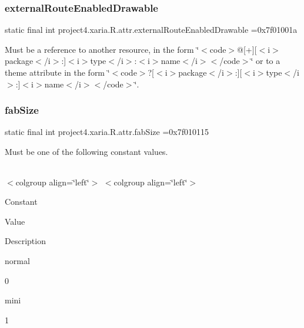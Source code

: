 \subsubsection{\texorpdfstring{external\+Route\+Enabled\+Drawable}{externalRouteEnabledDrawable}}
{\footnotesize\ttfamily static final int project4.\+xaria.\+R.\+attr.\+external\+Route\+Enabled\+Drawable =0x7f01001a\hspace{0.3cm}{\ttfamily [static]}}

Must be a reference to another resource, in the form \char`\"{}$<$code$>$@\mbox{[}+\mbox{]}\mbox{[}$<$i$>$package$<$/i$>$\+:\mbox{]}$<$i$>$type$<$/i$>$\+:$<$i$>$name$<$/i$>$$<$/code$>$\char`\"{} or to a theme attribute in the form \char`\"{}$<$code$>$?\mbox{[}$<$i$>$package$<$/i$>$\+:\mbox{]}\mbox{[}$<$i$>$type$<$/i$>$\+:\mbox{]}$<$i$>$name$<$/i$>$$<$/code$>$\char`\"{}. \mbox{\label{classproject4_1_1xaria_1_1R_1_1attr_a789956555161c24016c7cab1662f40f4}} 
\subsubsection{\texorpdfstring{fab\+Size}{fabSize}}
{\footnotesize\ttfamily static final int project4.\+xaria.\+R.\+attr.\+fab\+Size =0x7f010115\hspace{0.3cm}{\ttfamily [static]}}

Must be one of the following constant values.

\tabulinesep=1mm
\begin{longtabu} spread 0pt [c]{*{0}{|X[-1]}|}
\hline
\end{longtabu}
$<$colgroup align=\char`\"{}left\char`\"{}$>$ $<$colgroup align=\char`\"{}left\char`\"{}$>$ 

Constant

Value

Description 

{\ttfamily normal}

0

{\ttfamily mini}

1\mbox{\label{classproject4_1_1xaria_1_1R_1_1attr_ac80a0eb6b3455b8cd4bb68355de7deff}} 
